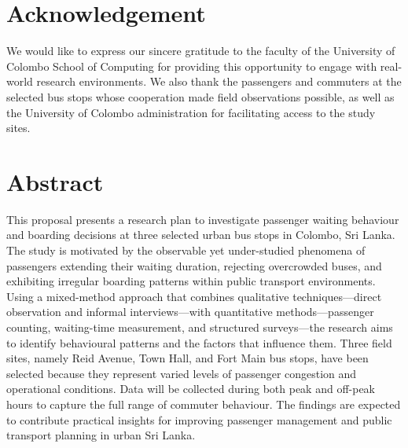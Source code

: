 \documentclass[12pt, a4paper]{report}
\begin{document}
\chapter*{Acknowledgement}

We would like to express our sincere gratitude to the faculty of the University of Colombo
School of Computing for providing this opportunity to engage with real-world research
environments. We also thank the passengers and commuters at the selected bus stops whose
cooperation made field observations possible, as well as the University of Colombo
administration for facilitating access to the study sites.

\chapter*{Abstract}

This proposal presents a research plan to investigate passenger waiting behaviour and
boarding decisions at three selected urban bus stops in Colombo, Sri Lanka. The study is
motivated by the observable yet under-studied phenomena of passengers extending their
waiting duration, rejecting overcrowded buses, and exhibiting irregular boarding patterns
within public transport environments. Using a mixed-method approach that combines
qualitative techniques—direct observation and informal interviews—with quantitative
methods—passenger counting, waiting-time measurement, and structured surveys—the
research aims to identify behavioural patterns and the factors that influence them. Three
field sites, namely Reid Avenue, Town Hall, and Fort Main bus stops, have been selected
because they represent varied levels of passenger congestion and operational conditions.
Data will be collected during both peak and off-peak hours to capture the full range of
commuter behaviour. The findings are expected to contribute practical insights for improving
passenger management and public transport planning in urban Sri Lanka.

\tableofcontents

\listoffigures
{}

\listoftables
{}
\end{document}
